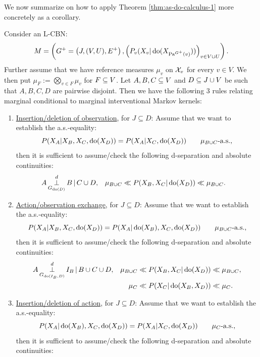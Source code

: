 We now summarize on how to apply Theorem \ref{thm:as-do-calculus-1} more concretely as a corollary.
\begin{Cor}
    \label{cor:as-do-calculus-2}
        Consider an L-CBN:
    \[M= \left ( G^+=\left ( J,(V,U),E^+ \right ), \left ( P_v ( X_v|\operatorname{do}( X_{\mathrm{Pa}^{G^+}(v)})) \right )_{v \in V \cup U} \right ).\]
    Further assume that we have %
    reference measures $\mu_v$ on $\mathcal{X}_v$ for every $v \in V$.
    We then put $\mu_F := \bigotimes_{v \in F} \mu_v$ for $F \subseteq V$.
    Let $A,B,C \subseteq V$ and $D \subseteq J \cup V$ be such that $A,B,C,D$ are pairwise disjoint.
    Then we have the following 3 rules relating marginal conditional to marginal interventional Markov kernels:
    \begin{enumerate}
        \item \underline{Insertion/deletion of observation}, for $J \subseteq D$:
            Assume that we want to establish the a.s.-equality:
            \[ P(X_A|X_B,X_C,\operatorname{do}(X_{D})) = P(X_A|X_C,\operatorname{do}(X_{D})) \qquad \mu_{B \cup C}\text{-a.s.}, \]
         then it is sufficient to assume/check the following d-separation and absolute continuities:
         \begin{align*} 
             A &\operatorname*{\perp}^d_{G_{\operatorname{do}(D)}} B \operatorname*{|} C \cup D, &
             \mu_{B \cup C} &\ll P(X_B,X_C|\operatorname{do}(X_{D}))\ll \mu_{B \cup C}.
         \end{align*}
     \item \underline{Action/observation exchange}, for $J \subseteq D$: 
         Assume that we want to establish the a.s.-equality:
         \[ P(X_A|X_B,X_C,\operatorname{do}(X_{D}))  = P(X_A|\operatorname{do}(X_B),X_C,\operatorname{do}(X_{D})) 
         \qquad \mu_{B \cup C}\text{-a.s.}, \]
         then it is sufficient to assume/check the following d-separation and absolute continuities:
         \begin{align*} 
             A & \operatorname*{\perp}^d_{G_{\operatorname{do}(I_B,D)}} I_B \operatorname*{|} B \cup C \cup D, &          
                    \mu_{B \cup C} &\ll  P(X_B,X_C|\operatorname{do}(X_{D})) \ll \mu_{B \cup C},\\
                 &&   \mu_C &\ll  P(X_C|\operatorname{do}(X_B,X_{D})) \ll \mu_C.
         \end{align*}
     \item \underline{Insertion/deletion of action}, for $J \subseteq D$: 
         Assume that we want to establish the a.s.-equality:
         \[ P(X_A|\operatorname{do}(X_B),X_C,\operatorname{do}(X_{D})) = P(X_A|X_C,\operatorname{do}(X_{D})) \qquad \mu_C\text{-a.s.}, \]
          then it is sufficient to assume/check the following d-separation and absolute continuities:

\end{enumerate}
\end{Cor}
